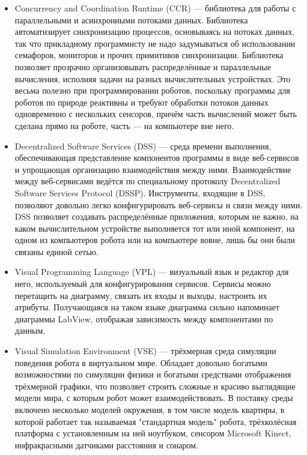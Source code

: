 \documentclass[a4paper]{article}
\begin{document}
\begin{itemize}
  \item Concurrency and Coordination Runtime (CCR) --- библиотека для работы с параллельными и асинхронными потоками данных. Библиотека автоматизирует синхронизацию процессов, основываясь на потоках данных, так что прикладному программисту не надо задумываться об использовании семафоров, мониторов и прочих примитивов синхронизации. Библиотека позволяет прозрачно организовывать распределённые и параллельные вычисления, исполняя задачи на разных вычислительных устройствах. Это весьма полезно при программировании роботов, поскольку программы для роботов по природе реактивны и требуют обработки потоков данных одновременно с нескольких сенсоров, причём часть вычислений может быть сделана прямо на роботе, часть --- на компьютере вне него.
  \item Decentralized Software Services (DSS) --- среда времени выполнения, обеспечивающая представление компонентов программы в виде веб-сервисов и упрощающая организацию взаимодействия между ними. Взаимодействие между веб-сервисами ведётся по специальному протоколу Decentralized Software Services Protocol (DSSP). Инструменты, входящие в DSS, позволяют довольно легко конфигурировать веб-сервисы и связи между ними. DSS позволяет создавать распределённые приложения, которым не важно, на каком вычислительном устройстве выполняется тот или иной компонент, на одном из компьютеров робота или на компьютере вовне, лишь бы они были связаны единой сетью.
  \item Visual Programming Language (VPL) --- визуальный язык и редактор для него, используемый для конфигурирования сервисов. Сервисы можно перетащить на диаграмму, связать их входы и выходы, настроить их атрибуты. Получающаяся на таком языке диаграмма сильно напоминает диаграммы LabView, отображая зависимость между компонентами по данным.
  \item Visual Simulation Environment (VSE) --- трёхмерная среда симуляции поведения робота в виртуальном мире. Обладает довольно богатыми возможностями по симуляции физики и богатыми средствами отображения трёхмерной графики, что позволяет строить сложные и красиво выглядящие модели мира, с которым робот может взаимодействовать. В поставку среды включено несколько моделей окружения, в том числе модель квартиры, в которой работает так называемая "стандартная модель" робота, трёхколёсная платформа с установленным на ней ноутбуком, сенсором Microsoft Kinect\textregistered, инфракрасными датчиками расстояния и сонаром.
\end{itemize}
\end{document}
